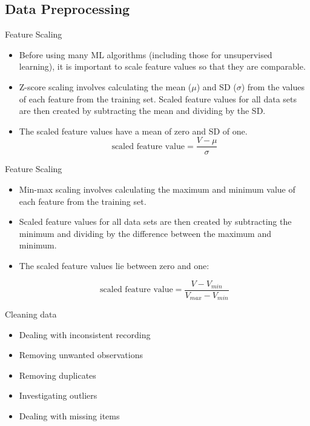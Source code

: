 \documentclass[11pt]{beamer}
\begin{document}
\subsection[subsection]{Data Preprocessing}
%
\begin{frame}{Feature Scaling}
	\begin{itemize}
		\item Before using many ML algorithms (including those for unsupervised learning), it is important to scale feature values so that they are comparable.
		\item  Z-score scaling involves calculating the mean ($\mu$) and SD ($\sigma$) from the values of each feature from the training set. Scaled feature values for all data sets are then created by subtracting the mean and dividing by the SD. 
\item The scaled feature values have a mean of zero and SD of one.
		\begin{equation}
		\text{scaled feature value} = \frac{V-\mu}{\sigma}
		\end{equation}
	\end{itemize}
\end{frame}
\begin{frame}{Feature Scaling}
	\begin{itemize}
		\item Min-max scaling involves calculating the maximum and minimum value of each feature from the training set. 
		\item Scaled feature values for all data sets are then created by subtracting the minimum and dividing by the difference between the maximum and minimum. 
		\item The scaled feature values lie between zero and one:
		
				\begin{equation}
		\text{scaled feature value} = \frac{V-V_{min}}{V_{max}-V_{min}}
		\end{equation}

	\end{itemize}
\end{frame}
\begin{frame}{Cleaning data}
	\begin{itemize}
		\item Dealing with inconsistent recording
		\item Removing unwanted observations
		\item Removing duplicates
		\item Investigating outliers
		\item Dealing with missing items
	\end{itemize}
\end{frame}
%
\end{document}
